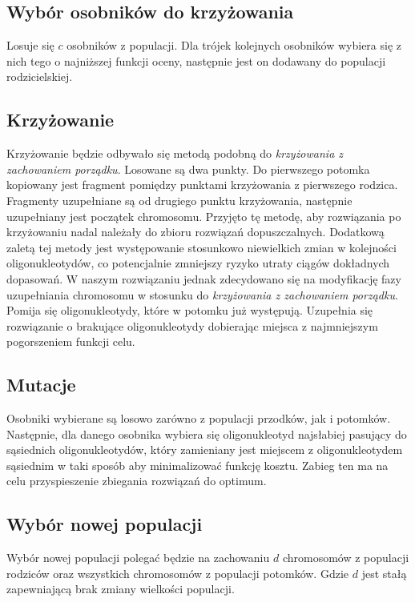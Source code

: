 \documentclass{article}
\begin{document}
\subsection{Wybór osobników do krzyżowania}
Losuje się $c$ osobników z populacji.
Dla trójek kolejnych osobników wybiera się z nich tego o najniższej funkcji oceny, następnie jest on dodawany do populacji rodzicielskiej.
\subsection{Krzyżowanie}
Krzyżowanie będzie odbywało się metodą podobną do \textit{krzyżowania z zachowaniem porządku}.
Losowane są dwa punkty. Do pierwszego potomka kopiowany jest fragment pomiędzy punktami krzyżowania z pierwszego rodzica.
Fragmenty uzupełniane są od drugiego punktu krzyżowania, następnie uzupełniany jest początek chromosomu. Przyjęto tę metodę, aby rozwiązania po krzyżowaniu nadal należały do zbioru rozwiązań dopuszczalnych. Dodatkową zaletą tej metody jest występowanie stosunkowo niewielkich  zmian w kolejności oligonukleotydów, co potencjalnie zmniejszy ryzyko utraty ciągów dokładnych dopasowań. W naszym rozwiązaniu jednak zdecydowano się na modyfikację fazy uzupełniania chromosomu w stosunku do \textit{krzyżowania z zachowaniem porządku}. 
Pomija się oligonukleotydy, które w potomku już występują.
Uzupełnia się rozwiązanie o brakujące oligonukleotydy dobierając miejsca z najmniejszym pogorszeniem funkcji celu.
\subsection{Mutacje}
Osobniki wybierane są losowo zarówno z populacji przodków, jak i potomków. Następnie, dla danego osobnika wybiera się oligonukleotyd najsłabiej pasujący do sąsiednich oligonukleotydów, który zamieniany jest miejscem z oligonukleotydem sąsiednim w taki sposób aby minimalizować funkcję kosztu. Zabieg ten ma na celu przyspieszenie zbiegania rozwiązań do optimum.
\subsection{Wybór nowej populacji}
Wybór nowej populacji polegać będzie na zachowaniu $d$ chromosomów z populacji rodziców oraz wszystkich chromosomów z populacji potomków. Gdzie $d$ jest stałą zapewniającą brak zmiany wielkości populacji.
\end{document}
